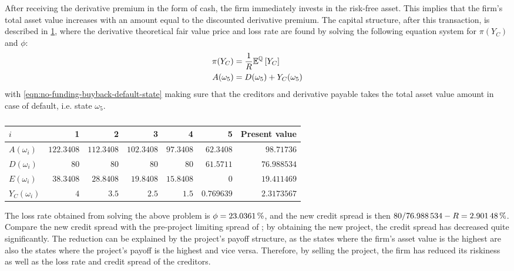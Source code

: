 \documentclass[../main.tex]{subfiles}
\begin{document}
            After receiving the derivative premium in the form of cash, the firm immediately invests in the risk-free asset. 
            This implies that the firm's total asset value increases with an amount equal to the discounted derivative premium. 
            The capital structure, after this transaction, is described in \cref{tbl:example-no-funding-buyback}, 
            where the derivative theoretical fair value price and loss rate are found
            by solving the following equation system for $\pi(Y_C)$ and $\phi$:
            \begin{align}
                \pi(Y_C) &= \frac{1}{R}\mathbb{E}^{\mathbb{Q}}\left[Y_{C}\right]
                \label{eqn:no-funding-buyback-derivative-fair-value}
                \\
                A(\omega_5) &= D(\omega_5) + Y_C(\omega_5)
                \label{eqn:no-funding-buyback-default-state}
            \end{align}
            with \cref{eqn:no-funding-buyback-default-state} making sure that the creditors and derivative payable
            takes the total asset value amount in case of default, i.e. state $\omega_5$.

            \begin{table}[H]
                \centering
                \begin{tabular}{l|rrrrr||r}
                    $i$ & 1 & 2 & 3 & 4 & 5 & Present value \\
                    \hline
                    $A(\omega_{i})$ & $\num{122.3408}$ & $\num{112.3408}$ & $\num{102.3408}$ & $\num{97.3408}$ & $\num{62.3408}$ & $\num{98.71736}$ \\
                    $D(\omega_{i})$ & $\num{80}$ & $\num{80}$ & $\num{80}$ & $\num{80}$ & $\num{61.5711}$ & $\num{76.988534}$ \\
                    $E(\omega_{i})$ & $38.3408$ & $\num{28.8408}$ & $\num{19.8408}$ & $\num{15.8408}$ & $\num{0}$ & $\num{19.411469}$ \\
                    $Y_C(\omega_{i})$ & $\num{4}$ & $\num{3.5}$ & $\num{2.5}$ & $\num{1.5}$ & $\num{0.769639}$ & $\num{2.3173567}$ \\
                \end{tabular}
                \caption{}
                \label{tbl:example-no-funding-buyback}
            \end{table}

            The loss rate obtained from solving the above problem is $\phi = \pct{0.230361}$, 
            and the new credit spread is then 
            $\num{80}/\num{76.988534} - \grossrfrate = \pct{0.0290148}$.
            Compare the new credit spread with the pre-project limiting spread of ;
            by obtaining the new project, the credit spread has decreased quite significantly.
            The reduction can be explained by the project's payoff structure,
            as the states where the firm's asset value is the highest are
            also the states where the project's payoff is the highest and vice versa. 
            Therefore, by selling the project, the firm has reduced its riskiness
            as well as the loss rate and credit spread of the creditors.
\end{document}
